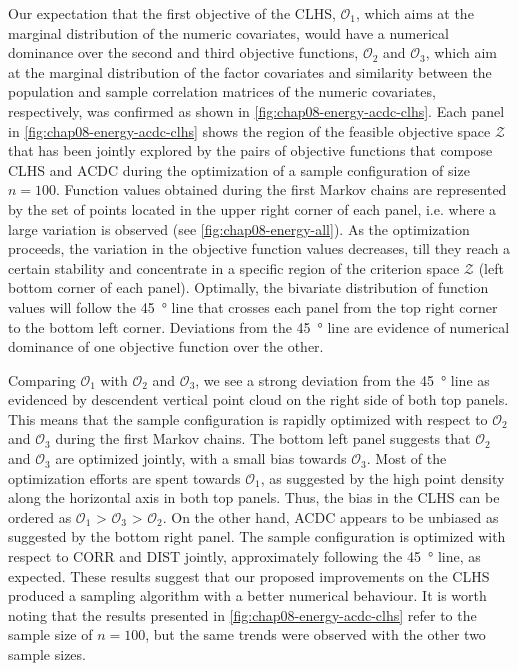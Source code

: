 Our expectation that the first objective of the CLHS, $\mathcal{O}_1$, which aims at the marginal distribution 
of the numeric covariates, would have a numerical dominance over the second and third objective functions, 
$\mathcal{O}_2$ and $\mathcal{O}_3$, which aim at the marginal distribution of the factor covariates and 
similarity between the population and sample correlation matrices of the numeric covariates, respectively, was 
confirmed as shown in \autoref{fig:chap08-energy-acdc-clhs}. Each panel in 
\autoref{fig:chap08-energy-acdc-clhs} shows the region of the feasible objective space $\mathcal{Z}$ that has 
been jointly explored by the pairs of objective functions that compose CLHS and ACDC during the optimization of 
a sample configuration of size $n = 100$. Function values obtained during the first Markov chains are 
represented by the set of points located in the upper right corner of each panel, i.e. where a large variation 
is observed (see \autoref{fig:chap08-energy-all}). As the optimization proceeds, the variation in the objective 
function values decreases, till they reach a certain stability and concentrate in a specific region of the 
criterion space $\mathcal{Z}$ (left bottom corner of each panel). Optimally, the bivariate distribution of 
function values will follow the \SI{45}{\degree} line that crosses each panel from the top right corner to the 
bottom left corner. Deviations from the \SI{45}{\degree} line are evidence of numerical dominance of one 
objective function over the other.

Comparing $\mathcal{O}_1$ with $\mathcal{O}_2$ and $\mathcal{O}_3$, we see a strong deviation from the 
\SI{45}{\degree} line as evidenced by descendent vertical point cloud on the right side of both top panels. 
This means that the sample configuration is rapidly optimized with respect to $\mathcal{O}_2$ and 
$\mathcal{O}_3$ during the first Markov chains. The bottom left panel suggests that $\mathcal{O}_2$ and 
$\mathcal{O}_3$ are optimized jointly, with a small bias towards $\mathcal{O}_3$. Most of the optimization 
efforts are spent towards $\mathcal{O}_1$, as suggested by the high point density along the horizontal axis in 
both 
top panels. Thus, the bias in the CLHS can be ordered as $\mathcal{O}_1$ > $\mathcal{O}_3$ > $\mathcal{O}_2$. 
On the other hand, ACDC appears to be unbiased as suggested by the bottom right panel. The sample configuration 
is optimized with respect to CORR and DIST jointly, approximately following the \SI{45}{\degree} line, as 
expected. These results suggest that our proposed improvements on the CLHS produced a sampling algorithm with a 
better numerical behaviour. It is worth noting that the results presented in 
\autoref{fig:chap08-energy-acdc-clhs} refer to the sample size of $n = 100$, but the same trends were observed 
with the other two sample sizes.

